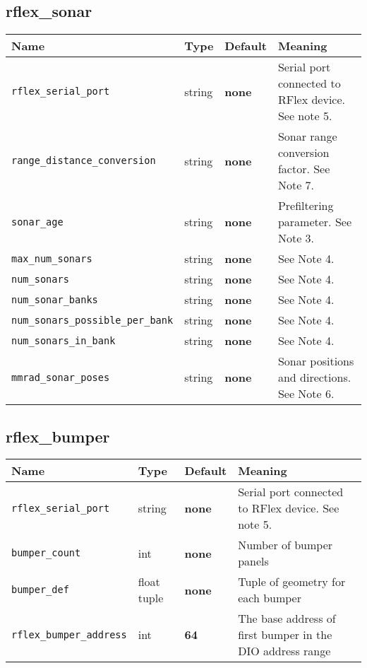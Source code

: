 \subsection*{rflex\_sonar}
\begin{center}
{\small \begin{tabular}{|l|l|l|l|}
\hline
Name & Type & Default & Meaning\\
\hline
{\tt rflex\_serial\_port} & string & {\bf none} & Serial port connected to RFlex device. See note 5.\\
{\tt range\_distance\_conversion} & string & {\bf none} & Sonar range conversion factor. See Note 7.\\
{\tt sonar\_age} & string & {\bf none} & Prefiltering parameter. See Note 3.\\
{\tt max\_num\_sonars} & string & {\bf none} & See Note 4.\\
{\tt num\_sonars} & string & {\bf none} & See Note 4.\\
{\tt num\_sonar\_banks} & string & {\bf none} & See Note 4.\\
{\tt num\_sonars\_possible\_per\_bank} & string & {\bf none} & See Note 4.\\
{\tt num\_sonars\_in\_bank} & string & {\bf none} & See Note 4.\\
{\tt mmrad\_sonar\_poses} & string & {\bf none} & Sonar positions and directions.  See Note 6.\\
\hline
\end{tabular}}
\end{center}

\subsection*{rflex\_bumper}
\begin{center}
{\small \begin{tabular}{|l|l|l|l|}
\hline
Name & Type & Default & Meaning\\
\hline
{\tt rflex\_serial\_port} & string & {\bf none} & Serial port connected to RFlex device. See note 5.\\
{\tt bumper\_count} & int & {\bf none} & Number of bumper panels\\
{\tt bumper\_def} & float tuple & {\bf none} & Tuple of geometry for each bumper\\
{\tt rflex\_bumper\_address} & int & {\bf 64} & The base address of first bumper in the DIO address range\\
\hline
\end{tabular}}
\end{center}

